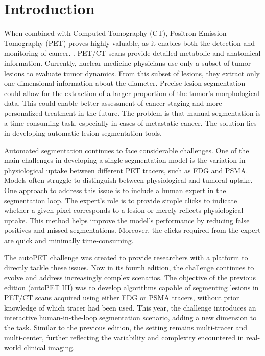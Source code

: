 \documentclass[runningheads]{llncs}
\begin{document}
\section{Introduction}
When combined with Computed Tomography (CT), Positron Emission Tomography (PET) proves highly valuable, as it enables both the detection and monitoring of cancer. . PET/CT scans provide detailed metabolic and anatomical information. Currently, nuclear medicine physicians use only a subset of tumor lesions to evaluate tumor dynamics. From this subset of lesions, they extract only one-dimensional information about the diameter. Precise lesion segmentation could allow for the extraction of a larger proportion of the tumor’s morphological data. This could enable better assessment of cancer staging and more personalized treatment in the future. The problem is that manual segmentation is a time-consuming task, especially in cases of metastatic cancer. The solution lies in developing automatic lesion segmentation tools.

Automated segmentation continues to face considerable challenges. One of the main challenges in developing a single segmentation model is the variation in physiological uptake between different PET tracers, such as FDG and PSMA. Models often struggle to distinguish between physiological and tumoral uptake. One approach to address this issue is to include a human expert in the segmentation loop. The expert’s role is to provide simple clicks to indicate whether a given pixel corresponds to a lesion or merely reflects physiological uptake. This method helps improve the model’s performance by reducing false positives and missed segmentations. Moreover, the clicks required from the expert are quick and minimally time-consuming. 

The autoPET challenge was created to provide researchers with a platform to directly tackle these issues. Now in its fourth edition, the challenge continues to evolve and address increasingly complex scenarios. The objective of the previous edition (autoPET III) was to develop algorithms capable of segmenting lesions in PET/CT scans acquired using either FDG or PSMA tracers, without prior knowledge of which tracer had been used. This year, the challenge introduces an interactive human-in-the-loop segmentation scenario, adding a new dimension to the task. Similar to the previous edition, the setting remains multi-tracer and multi-center, further reflecting the variability and complexity encountered in real-world clinical imaging. 
\end{document}
